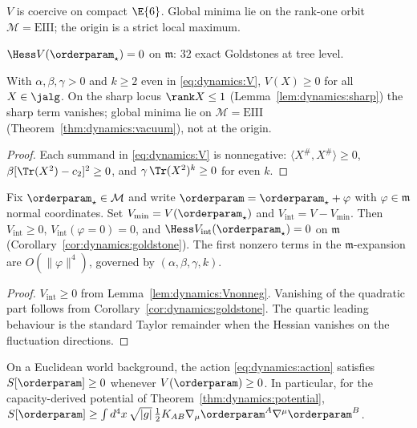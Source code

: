 \begin{theorem}\label{thm:dynamics:vacuum}
$V$ is coercive on compact $\E{6}$. Global minima lie on the rank-one orbit
$\mathcal{M}=\mathrm{EIII}$; the origin is a strict local maximum.
\end{theorem}

\begin{corollary}\label{cor:dynamics:goldstone}
$\Hess V(\orderparam_\star)=0$ on $\mathfrak{m}$: $32$ exact Goldstones at tree
level.
\end{corollary}

\begin{lemma}\label{lem:dynamics:Vnonneg}
With $\alpha,\beta,\gamma>0$ and $k\geq2$ even in \eqref{eq:dynamics:V},
$V(X)\geq0$ for all $X\in\jalg$. On the sharp locus $\rank X\leq1$
(Lemma~\ref{lem:dynamics:sharp}) the sharp term vanishes; global minima lie on
$\mathcal{M}=\mathrm{EIII}$ (Theorem~\ref{thm:dynamics:vacuum}), not at the
origin.
\end{lemma}

\begin{proof}
Each summand in \eqref{eq:dynamics:V} is nonnegative:
$\langle X^{\#},X^{\#}\rangle\geq0$,
$\beta[\Tr(X^2)-c_2]^2\geq0$, and $\gamma\,\Tr(X^2)^k\geq0$ for even $k$.
\end{proof}

\begin{lemma}\label{lem:dynamics:interaction}
Fix $\orderparam_\star\in\mathcal{M}$ and write
$\orderparam=\orderparam_\star+\varphi$ with $\varphi\in\mathfrak{m}$ normal
coordinates. Set $V_{\min}=V(\orderparam_\star)$ and
$V_{\mathrm{int}}=V-V_{\min}$. Then $V_{\mathrm{int}}\geq0$,
$V_{\mathrm{int}}(\varphi=0)=0$, and
$\Hess V_{\mathrm{int}}(\orderparam_\star)=0$ on $\mathfrak{m}$
(Corollary~\ref{cor:dynamics:goldstone}). The first nonzero terms in the
$\mathfrak{m}$-expansion are $O(\|\varphi\|^4)$, governed by
$(\alpha,\beta,\gamma,k)$.
\end{lemma}

\begin{proof}
$V_{\mathrm{int}}\geq0$ from Lemma~\ref{lem:dynamics:Vnonneg}. Vanishing of
the quadratic part follows from Corollary~\ref{cor:dynamics:goldstone}. The
quartic leading behaviour is the standard Taylor remainder when the Hessian
vanishes on the fluctuation directions.
\end{proof}

\begin{proposition}\label{prop:dynamics:action-bounded}
On a Euclidean world background, the action \eqref{eq:dynamics:action}
satisfies $S[\orderparam]\geq0$ whenever $V(\orderparam)\geq0$. In
particular, for the capacity-derived potential of
Theorem~\ref{thm:dynamics:potential}, $S[\orderparam]\geq
\int d^4x\,\sqrt{|g|}\,\frac{1}{2}K_{AB}\nabla_\mu\orderparam^A\nabla^\mu\orderparam^B$.
\end{proposition}

